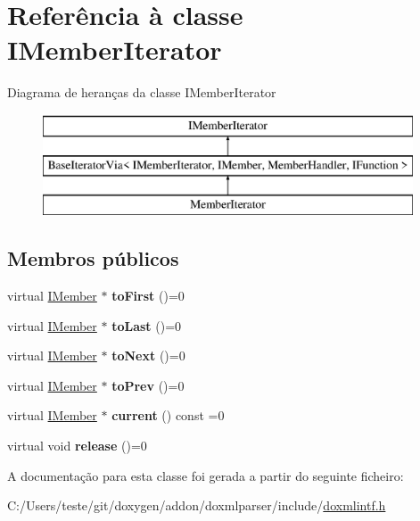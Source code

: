 \hypertarget{class_i_member_iterator}{\section{Referência à classe I\-Member\-Iterator}
\label{class_i_member_iterator}
}
Diagrama de heranças da classe I\-Member\-Iterator\begin{figure}[H]
\begin{center}
\leavevmode
\includegraphics[height=3.000000cm]{class_i_member_iterator}
\end{center}
\end{figure}
\subsection*{Membros públicos}
\begin{DoxyCompactItemize}
\item 
\hypertarget{class_i_member_iterator_aebaf9b0e55a768886b12533e764380cf}{virtual \hyperlink{class_i_member}{I\-Member} $\ast$ {\bfseries to\-First} ()=0}\label{class_i_member_iterator_aebaf9b0e55a768886b12533e764380cf}

\item 
\hypertarget{class_i_member_iterator_ac6fefcb4f8e82a9c120090936b1beb71}{virtual \hyperlink{class_i_member}{I\-Member} $\ast$ {\bfseries to\-Last} ()=0}\label{class_i_member_iterator_ac6fefcb4f8e82a9c120090936b1beb71}

\item 
\hypertarget{class_i_member_iterator_af947ccaa3be651665fd5310ff1db014d}{virtual \hyperlink{class_i_member}{I\-Member} $\ast$ {\bfseries to\-Next} ()=0}\label{class_i_member_iterator_af947ccaa3be651665fd5310ff1db014d}

\item 
\hypertarget{class_i_member_iterator_a1cd0e141fe57aabd39ace075923c7640}{virtual \hyperlink{class_i_member}{I\-Member} $\ast$ {\bfseries to\-Prev} ()=0}\label{class_i_member_iterator_a1cd0e141fe57aabd39ace075923c7640}

\item 
\hypertarget{class_i_member_iterator_a3d3848ca10dd9dbfd3c74e0044be972a}{virtual \hyperlink{class_i_member}{I\-Member} $\ast$ {\bfseries current} () const =0}\label{class_i_member_iterator_a3d3848ca10dd9dbfd3c74e0044be972a}

\item 
\hypertarget{class_i_member_iterator_aab0a52fdd148a54108e7bf49287d7c47}{virtual void {\bfseries release} ()=0}\label{class_i_member_iterator_aab0a52fdd148a54108e7bf49287d7c47}

\end{DoxyCompactItemize}


A documentação para esta classe foi gerada a partir do seguinte ficheiro\-:\begin{DoxyCompactItemize}
\item 
C\-:/\-Users/teste/git/doxygen/addon/doxmlparser/include/\hyperlink{include_2doxmlintf_8h}{doxmlintf.\-h}\end{DoxyCompactItemize}
